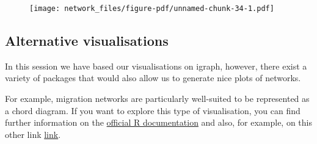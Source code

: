 \documentclass[
  letterpaper,
  DIV=11,
  numbers=noendperiod]{scrreprt}
\newenvironment{Shaded}{\begin{snugshade}}{\end{snugshade}}
\newcommand{\AttributeTok}[1]{\textcolor[rgb]{0.40,0.45,0.13}{#1}}
\newcommand{\ConstantTok}[1]{\textcolor[rgb]{0.56,0.35,0.01}{#1}}
\newcommand{\DecValTok}[1]{\textcolor[rgb]{0.68,0.00,0.00}{#1}}
\newcommand{\FloatTok}[1]{\textcolor[rgb]{0.68,0.00,0.00}{#1}}
\newcommand{\FunctionTok}[1]{\textcolor[rgb]{0.28,0.35,0.67}{#1}}
\newcommand{\NormalTok}[1]{\textcolor[rgb]{0.00,0.23,0.31}{#1}}
\newcommand{\SpecialCharTok}[1]{\textcolor[rgb]{0.37,0.37,0.37}{#1}}
\newcommand{\StringTok}[1]{\textcolor[rgb]{0.13,0.47,0.30}{#1}}
\begin{document}
\begin{Shaded}
\end{Shaded}

\begin{figure}[H]

{\centering \texttt{[image: network\_files/figure-pdf/unnamed-chunk-34-1.pdf]}

}

\end{figure}

\hypertarget{alternative-visualisations}{%
\subsection{Alternative
visualisations}\label{alternative-visualisations}}

In this session we have based our visualisations on igraph, however,
there exist a variety of packages that would also allow us to generate
nice plots of networks.

For example, migration networks are particularly well-suited to be
represented as a chord diagram. If you want to explore this type of
visualisation, you can find further information on the
\href{https://www.rdocumentation.org/packages/circlize/versions/0.4.15/topics/chordDiagram}{official
R documentation} and also, for example, on this other link
\href{https://r-graph-gallery.com/122-a-circular-plot-with-the-circlize-package.html}{link}.
\end{document}
